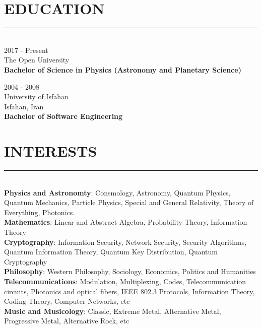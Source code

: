 \documentclass[10pt,a4paper]{article}
\begin{document}
\section{EDUCATION}
\noindent \rule {18.0cm}{0.2pt} \\
\textbullet \hspace{0.1cm} 2017 - Present \\
The Open University \\
\textbf{Bachelor of Science in Physics (Astronomy and Planetary Science)}
\vspace{0.3cm}

\noindent \textbullet \hspace{0.1cm}  2004 - 2008 \\
University of Isfahan \\
Isfahan, Iran \\
\textbf{Bachelor of Software Engineering}


\section{INTERESTS}
\noindent \rule {18.0cm}{0.2pt} \\
\textbullet \hspace{0.1cm} \textbf{Physics and Astronomty}: Consmology, Astronomy, Quantum Physics, Quantum Mechanics, Particle Physics, Special and General Relativity, Theory of Everything, Photonics. \\
\textbullet \hspace{0.1cm} \textbf{Mathematics}: Linear and Abstract Algebra, Probability Theory, Information Theory \\
\textbullet \hspace{0.1cm} \textbf{Cryptography}: Information Security, Network Security, Security Algorithms, Quantum Information Theory, Quantum Key Distribution, Quantum Cryptography \\
\textbullet \hspace{0.1cm} \textbf{Philosophy}: Western Philosophy, Sociology, Economics, Politics and Humanities \\
\textbullet \hspace{0.1cm} \textbf{Telecommunications}: Modulation, Multiplexing, Codes, Telecommunication circuits, Photonics and optical fibers, IEEE 802.3 Protocols, Information Theory, Coding Theory, Computer Networks, etc \\
\textbullet \hspace{0.1cm} \textbf{Music and Musicology}: Classic, Extreme Metal, Alternative Metal, Progressive Metal, Alternative Rock, etc
\end{document}
